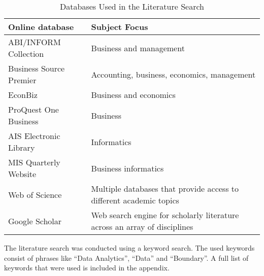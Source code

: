 \begin{table}[htbp]
    \centering
    \begin{tabular}{lL{8cm}}
    \hline
    Online database           & Subject Focus                                                          \\ \hline
    ABI/INFORM Collection     & Business and management                                                \\
    Business Source Premier   & Accounting, business, economics, management                            \\
    EconBiz                   & Business and economics                                                 \\
    ProQuest One Business     & Business                                                               \\
    AIS Electronic Library    & Informatics                                                            \\
    MIS Quarterly Website     & Business informatics                                                   \\
    Web of Science            & Multiple databases that provide access to different academic topics    \\
    Google Scholar            & Web search engine for scholarly literature across an array of disciplines \\ \hline
    \end{tabular}
    \caption{Databases Used in the Literature Search}
    \label{literature_search_db}
    \end{table}


The literature search was conducted using a keyword search. The used keywords consist of phrases like \enquote{Data Analytics}, \enquote{Data} and \enquote{Boundary}. A full list of keywords that were used is included in the appendix. %


